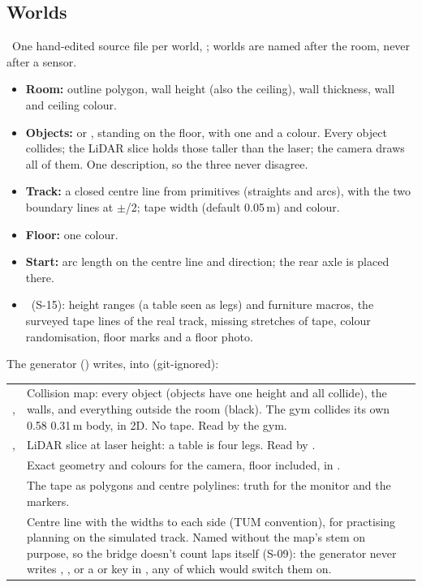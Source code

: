 \documentclass[11pt,a4paper]{article}
\newcommand{\planned}{\target{Planned}}
\newcommand{\deferred}{\target{Deferred}}
\begin{document}
\subsection{Worlds}\label{sec:world}
\planned\ One hand-edited source file per world, ; worlds are named after the room, never after a sensor.
\begin{itemize}
  \item \textbf{Room:} outline polygon, wall height (also the ceiling), wall thickness, wall and ceiling colour.
  \item \textbf{Objects:}  or , standing on the floor, with one  and a colour. Every object collides; the LiDAR slice holds those taller than the laser; the camera draws all of them. One description, so the three never disagree.
  \item \textbf{Track:} a closed centre line from primitives (straights and arcs), with the two boundary lines at $\pm$/2; tape width (default 0.05\,m) and colour.
  \item \textbf{Floor:} one colour.
  \item \textbf{Start:} arc length on the centre line and direction; the rear axle is placed there.
  \item \deferred\ (S-15): height ranges (a table seen as legs) and furniture macros, the surveyed tape lines of the real track, missing stretches of tape, colour randomisation, floor marks and a floor photo.
\end{itemize}

The generator () writes, into  (git-ignored):

\begin{tabularx}{\textwidth}{@{}L{3.6cm} Y@{}}
\toprule
{} &  \\
\midrule
\endhead
{},  & Collision map: every object (objects have one height and all collide), the walls, and everything outside the room (black). The gym collides its own 0.58\,\x\,0.31\,m body, in 2D. No tape. Read by the gym. \\
,  & LiDAR slice at laser height: a table is four legs. Read by . \\
 & Exact geometry and colours for the camera, floor included, in . \\
 & The tape as polygons and centre polylines: truth for the monitor and the markers. \\
 & Centre line with the widths to each side (TUM convention), for practising planning on the simulated track. Named without the map's stem on purpose, so the bridge doesn't count laps itself (S-09): the generator never writes , , or a  or  key in , any of which would switch them on. \\
\bottomrule
\end{tabularx}
\end{document}
